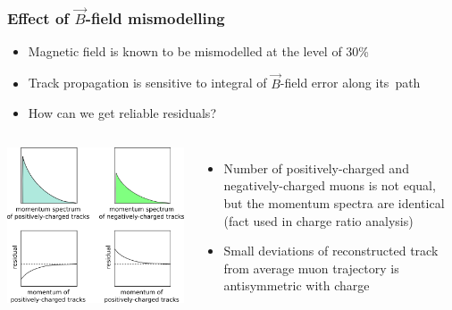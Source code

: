\documentclass[compress]{beamer}
\begin{document}
\begin{frame}
\frametitle{Effect of $\vec{B}$-field mismodelling}

\begin{itemize}
\item Magnetic field is known to be mismodelled at the level of 30\%
\item Track propagation is sensitive to integral of $\vec{B}$-field error along \mbox{its path\hspace{-1 cm}}
\item How can we get reliable residuals?
\end{itemize}

\begin{columns}
\includegraphics[width=\linewidth]{momentum_explanation.png}

\vspace{-1 cm}
\begin{itemize}
\item Number of positively-charged and negatively-charged muons is not
  equal, but the momentum spectra are identical (fact used in charge
  ratio analysis)

\item Small deviations of reconstructed track from average muon
  trajectory is antisymmetric with charge
\end{itemize}
\end{columns}
\end{frame}
\end{document}
